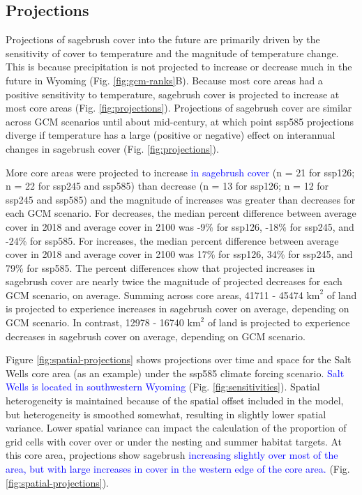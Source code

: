 \documentclass[
  12pt,
]{article}
\begin{document}
\hypertarget{projections}{%
\subsection{Projections}\label{projections}}

Projections of sagebrush cover into the future are primarily driven by the sensitivity of cover to temperature and the magnitude of temperature change.
This is because precipitation is not projected to increase or decrease much in the future in Wyoming (Fig. \ref{fig:gcm-ranks}B).
Because most core areas had a positive sensitivity to temperature, sagebrush cover is projected to increase at most core areas (Fig. \ref{fig:projections}).
Projections of sagebrush cover are similar across GCM scenarios until about mid-century, at which point ssp585 projections diverge if temperature has a large (positive or negative) effect on interannual changes in sagebrush cover (Fig. \ref{fig:projections}).

More core areas were projected to increase \textcolor{blue}{in sagebrush cover} (n = 21 for ssp126; n = 22 for ssp245 and ssp585) than decrease (n = 13 for ssp126; n = 12 for ssp245 and ssp585) and the magnitude of increases was greater than decreases for each GCM scenario.
For decreases, the median percent difference between average cover in 2018 and average cover in 2100 was -9\% for ssp126, -18\% for ssp245, and -24\% for ssp585.
For increases, the median percent difference between average cover in 2018 and average cover in 2100 was 17\% for ssp126, 34\% for ssp245, and 79\% for ssp585.
The percent differences show that projected increases in sagebrush cover are nearly twice the magnitude of projected decreases for each GCM scenario, on average.
Summing across core areas, 41711 - 45474 \(\text{km}^2\) of land is projected to experience increases in sagebrush cover on average, depending on GCM scenario.
In contrast, 12978 - 16740 \(\text{km}^2\) of land is projected to experience decreases in sagebrush cover on average, depending on GCM scenario.

Figure \ref{fig:spatial-projections} shows projections over time and space for the Salt Wells core area (as an example) under the ssp585 climate forcing scenario.
\textcolor{blue}{Salt Wells is located in southwestern Wyoming} (Fig. \ref{fig:sensitivities}).
Spatial heterogeneity is maintained because of the spatial offset included in the model, but heterogeneity is smoothed somewhat, resulting in slightly lower spatial variance.
Lower spatial variance can impact the calculation of the proportion of grid cells with cover over or under the nesting and summer habitat targets.
At this core area, projections show sagebrush \textcolor{blue}{increasing slightly over most of the area, but with large increases in cover in the western edge of the core area.} (Fig. \ref{fig:spatial-projections}).
\end{document}
